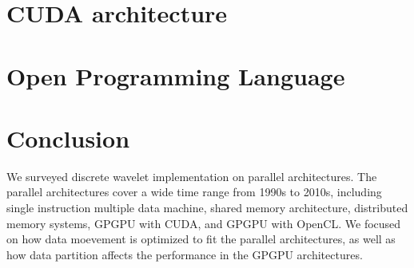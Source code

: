 \documentclass{article}
\begin{document}
\section{CUDA architecture}
\label{sec:cuda}


\section{Open Programming Language}
\label{sec:opencl}


\section{Conclusion}
\label{sec:conclusion}
%
We surveyed discrete wavelet implementation on parallel architectures.
%
The parallel architectures cover a wide time range from 1990s to 2010s,
including single instruction multiple data machine, shared memory architecture, 
distributed memory systems, GPGPU with CUDA, and GPGPU with OpenCL. 
%
We focused on how data moevement is optimized to fit the parallel architectures,
as well as how data partition affects the performance in the GPGPU architectures.

 
%

\end{document}
